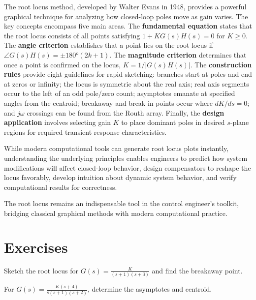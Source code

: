 The root locus method, developed by Walter Evans in 1948, provides a powerful graphical technique for analyzing how closed-loop poles move as gain varies. The key concepts encompass five main areas. The \textbf{fundamental equation} states that the root locus consists of all points satisfying $1 + KG(s)H(s) = 0$ for $K \geq 0$. The \textbf{angle criterion} establishes that a point lies on the root locus if $\angle G(s)H(s) = \pm 180°(2k+1)$. The \textbf{magnitude criterion} determines that once a point is confirmed on the locus, $K = 1/|G(s)H(s)|$. The \textbf{construction rules} provide eight guidelines for rapid sketching: branches start at poles and end at zeros or infinity; the locus is symmetric about the real axis; real axis segments occur to the left of an odd pole/zero count; asymptotes emanate at specified angles from the centroid; breakaway and break-in points occur where $dK/ds = 0$; and $j\omega$ crossings can be found from the Routh array. Finally, the \textbf{design application} involves selecting gain $K$ to place dominant poles in desired $s$-plane regions for required transient response characteristics.

While modern computational tools can generate root locus plots instantly, understanding the underlying principles enables engineers to predict how system modifications will affect closed-loop behavior, design compensators to reshape the locus favorably, develop intuition about dynamic system behavior, and verify computational results for correctness.

The root locus remains an indispensable tool in the control engineer's toolkit, bridging classical graphical methods with modern computational practice.

\newpage
\section{Exercises}
\label{sec:exercises}

\begin{exercise}
Sketch the root locus for $G(s) = \frac{K}{(s+1)(s+3)}$ and find the breakaway point.
\end{exercise}

\begin{exercise}
For $G(s) = \frac{K(s+4)}{s(s+1)(s+2)}$, determine the asymptotes and centroid.
\end{exercise}

